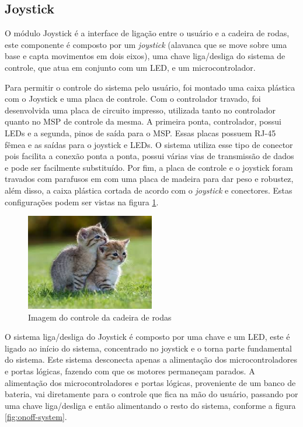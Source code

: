 	\subsection{Joystick}

		O módulo Joystick é a interface de ligação entre o usuário e a cadeira de rodas, este componente é composto por um \textit{joystick} (alavanca que se move sobre uma base e capta movimentos em dois eixos), uma chave liga/desliga do sistema de controle, que atua em conjunto com um LED, e um microcontrolador.

		Para permitir o controle do sistema pelo usuário, foi montado uma caixa plástica com o Joystick e uma placa de controle. Com o controlador travado, foi desenvolvida uma placa de circuito impresso, utilizada tanto no controlador quanto no MSP de controle da mesma. A primeira ponta, controlador, possui LEDs e a segunda, pinos de saída para o MSP. Essas placas possuem RJ-45 fêmea e as saídas para o joystick e LEDs. O sistema utiliza esse tipo de conector pois facilita a conexão ponta a ponta, possui várias vias de transmissão de dados e pode ser facilmente substituído. Por fim, a placa de controle e o joystick foram travados com parafusos em com uma placa de madeira para dar peso e robustez, além disso, a caixa plástica cortada de acordo com o \textit{joystick} e conectores. Estas configurações podem ser vistas na figura \ref{fig:joy_hand_control}.

		\begin{figure}[!htb]
			\centering
			\includegraphics[width = 0.5\textwidth]{figuras/resultados/joy_hand_control}
			\caption{Imagem do controle da cadeira de rodas}
			\label{fig:joy_hand_control}
		\end{figure}

		O sistema liga/desliga do Joystick é composto por uma chave e um LED, este é ligado ao início do sistema, concentrado no joystick e o torna parte fundamental do sistema. Este sistema desconecta apenas a alimentação dos microcontroladores e portas lógicas, fazendo com que os motores permaneçam parados. A alimentação dos microcontroladores e portas lógicas, proveniente de um banco de bateria, vai diretamente para o controle que fica na mão do usuário, passando por uma chave liga/desliga e então alimentando o resto do sistema, conforme a figura \ref{fig:onoff-system}. 
		
